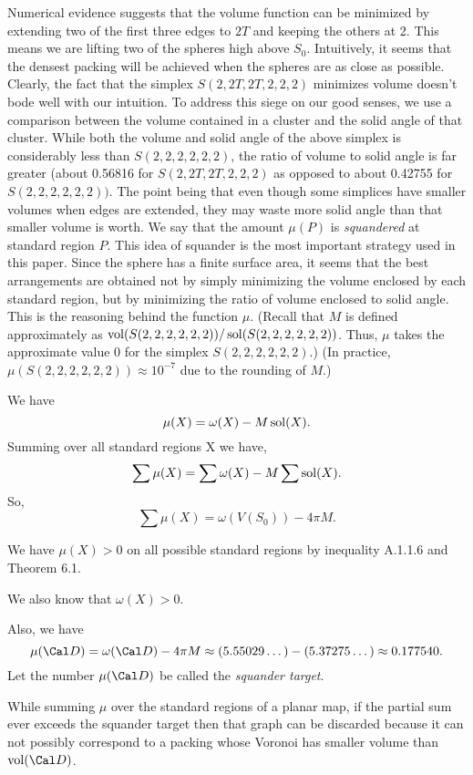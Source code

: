 Numerical evidence suggests that 
the volume function can be minimized by extending two of the first three edges to $2T$ 
and keeping the others at 2.  This means we are lifting two of the spheres high above $S_0$. 
 Intuitively, it seems that the densest packing will be achieved when the spheres are as
 close as possible.  Clearly, the fact that the simplex $S(2,2T,2T,2,2,2)$ minimizes 
volume doesn't bode well with our intuition.  To address this siege on our good senses, we use a 
comparison between the volume contained in a cluster and the solid angle of that cluster.  
While both  the volume and solid angle of the above simplex is considerably less than 
$S(2,2,2,2,2,2)$, the ratio of volume to solid angle is far greater
(about 0.56816 for $S(2,2T,2T,2,2,2)$ as opposed to about 0.42755 for $S(2,2,2,2,2,2))$.  
The point being that even though some simplices have smaller volumes when edges are extended, they may 
waste more solid angle than that smaller  volume is worth.  We say that the 
amount $\mu(P)$ is {\it squandered} at standard region $P$.  This idea of squander 
is the most important strategy used in this paper.
Since the sphere has a finite surface area, it seems that the best arrangements are 
obtained not by simply minimizing the volume enclosed by each standard region, 
but by minimizing the ratio of volume enclosed to solid angle.  This is the reasoning 
behind the function $\mu$.  (Recall that $M$ is defined approximately as 
$\operatorname{vol}(S(2,2,2,2,2,2))/\operatorname{sol}(S(2,2,2,2,2,2))$.  Thus, $\mu$ takes the approximate value $0$ for
 the simplex $S(2,2,2,2,2,2)$.)  
(In practice, $\mu(S(2,2,2,2,2,2))\approx 10^{-7}$ due to the 
rounding of $M$.)  


We have $$\mu(X)=\omega(X)-M \operatorname{sol}(X).$$
Summing over all standard regions X we have,
$$\sum \mu(X)=\sum \omega(X)-M \sum \operatorname{sol}(X).$$
So,
$$\sum \mu(X)=\omega(V(S_0))-4 \pi M.$$

We have $\mu(X)>0$ on all possible standard regions 
by inequality A.1.1.6 and Theorem 6.1.  

We also know that $\omega(X)>0$.

Also, we have $$\mu(\Cal D)=\omega(\Cal D)-4 \pi M \approx (5.55029\dots) -( 5.37275\dots) \approx 0.177540.$$  
Let the number $\mu(\Cal D)$ %
be called the {\it squander target}.  

While summing $\mu$ over the standard regions of a planar map, if the partial sum ever
 exceeds the squander target then that graph can be discarded because it can not 
possibly correspond to a packing whose Voronoi has smaller volume than $\vol(\Cal D)$.


